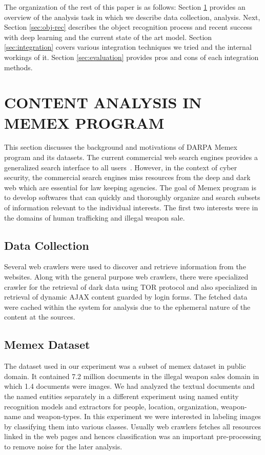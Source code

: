 \documentclass[letterpaper, 10 pt, conference]{ieeeconf}  %
\begin{document}
The organization of the rest of this paper is as follows: Section \ref{sec:memex} provides an overview of the analysis task in which we describe data collection, analysis. Next, Section \ref{sec:obj-rec} describes the object recognition process and recent success with deep learning and the current state of the art model. Section \ref{sec:integration} covers various integration techniques we tried and the internal workings of it. Section \ref{sec:evaluation} provides pros and cons of each integration methods.

\section{CONTENT ANALYSIS IN MEMEX PROGRAM} \label{sec:memex}
This section discusses the background and motivations of DARPA Memex program and its datasets. The current commercial web search engines provides a generalized search interface to all users~\cite{}. However, in the context of cyber security, the commercial search engines miss resources from the deep and dark web which are essential for law keeping agencies. The goal of Memex program is to develop softwares that can quickly and thoroughly organize and search subsets of information relevant to the individual interests. The first two interests were in the domains of human trafficking and illegal weapon sale.
\subsection{Data Collection}
\label{sec:memex-datacollection}
Several web crawlers were used to discover and retrieve information from the websites.
Along with the general purpose web crawlers, there were specialized crawler for the retrieval of dark data using TOR protocol \cite{} and also specialized in retrieval of dynamic AJAX content guarded by login forms. The fetched data were cached within the system for analysis due to the ephemeral nature of the content at the sources.

\subsection{Memex Dataset} \label{sec:memex-dataset}
The dataset used in our experiment was a subset of memex dataset in public domain. It contained 7.2 million documents in the illegal weapon sales domain in which 1.4 documents were images. We had analyzed the textual documents and the named entities separately in a different experiment using named entity recognition models and extractors for people, location, organization, weapon-name and weapon-types. In this experiment we were interested in labeling images by classifying them into various classes. Usually web crawlers fetches all resources linked in the web pages and hences classification was an important pre-processing to remove noise for the later analysis.
\end{document}
